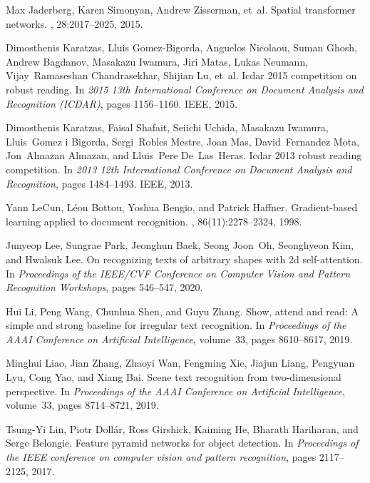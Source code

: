 \documentclass[final]{cvpr}
\begin{document}
{\begin{thebibliography}{10}
Max Jaderberg, Karen Simonyan, Andrew Zisserman, et~al.
\newblock Spatial transformer networks.
,
  28:2017--2025, 2015.

Dimosthenis Karatzas, Lluis Gomez-Bigorda, Anguelos Nicolaou, Suman Ghosh,
  Andrew Bagdanov, Masakazu Iwamura, Jiri Matas, Lukas Neumann,
  Vijay~Ramaseshan Chandrasekhar, Shijian Lu, et~al.
\newblock Icdar 2015 competition on robust reading.
\newblock In {\em 2015 13th International Conference on Document Analysis and
  Recognition (ICDAR)}, pages 1156--1160. IEEE, 2015.

Dimosthenis Karatzas, Faisal Shafait, Seiichi Uchida, Masakazu Iwamura,
  Lluis~Gomez i Bigorda, Sergi~Robles Mestre, Joan Mas, David~Fernandez Mota,
  Jon~Almazan Almazan, and Lluis~Pere De~Las~Heras.
\newblock Icdar 2013 robust reading competition.
\newblock In {\em 2013 12th International Conference on Document Analysis and
  Recognition}, pages 1484--1493. IEEE, 2013.

Yann LeCun, L{\'e}on Bottou, Yoshua Bengio, and Patrick Haffner.
\newblock Gradient-based learning applied to document recognition.
, 86(11):2278--2324, 1998.

Junyeop Lee, Sungrae Park, Jeonghun Baek, Seong Joon~Oh, Seonghyeon Kim, and
  Hwalsuk Lee.
\newblock On recognizing texts of arbitrary shapes with 2d self-attention.
\newblock In {\em Proceedings of the IEEE/CVF Conference on Computer Vision and
  Pattern Recognition Workshops}, pages 546--547, 2020.

Hui Li, Peng Wang, Chunhua Shen, and Guyu Zhang.
\newblock Show, attend and read: A simple and strong baseline for irregular
  text recognition.
\newblock In {\em Proceedings of the AAAI Conference on Artificial
  Intelligence}, volume~33, pages 8610--8617, 2019.

Minghui Liao, Jian Zhang, Zhaoyi Wan, Fengming Xie, Jiajun Liang, Pengyuan Lyu,
  Cong Yao, and Xiang Bai.
\newblock Scene text recognition from two-dimensional perspective.
\newblock In {\em Proceedings of the AAAI Conference on Artificial
  Intelligence}, volume~33, pages 8714--8721, 2019.

Tsung-Yi Lin, Piotr Doll{\'a}r, Ross Girshick, Kaiming He, Bharath Hariharan,
  and Serge Belongie.
\newblock Feature pyramid networks for object detection.
\newblock In {\em Proceedings of the IEEE conference on computer vision and
  pattern recognition}, pages 2117--2125, 2017.


\end{thebibliography}}
\end{document}
